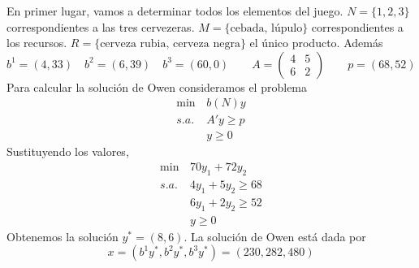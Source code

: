 \documentclass[twoside]{article}
\begin{document}
\begin{solucion}
En primer lugar, vamos a determinar todos los elementos del juego. $N=\{1,2,3\}$ correspondientes a las tres cervezeras. $M=\{\text{cebada, lúpulo}\}$ correspondientes a los recursos. $R=\{\text{cerveza rubia, cerveza negra}\}$ el único producto. Además
$$
b^1 = (4,33) \quad b^2 =(6,39) \quad b^3 = (60,0) \qquad A = \begin{pmatrix}
4 & 5\\
6 & 2
\end{pmatrix} \qquad p = (68,52)
$$
Para calcular la solución de Owen consideramos el problema
\begin{align*}
\min\, & b(N)y\\
s.a.\,&A'y\geq p\\
& y\geq 0
\end{align*}
Sustituyendo los valores,
\begin{align*}
\min\, & 70y_1 + 72y_2\\
s.a.\,&
4y_1 + 5y_2\geq 68\\
&6y_1 + 2y_2 \geq 52\\
& y\geq 0
\end{align*}
Obtenemos la solución $y^* = (8,6)$. La solución de Owen está dada por
$$
x = (b^1y^*,b^2y^*,b^3y^*) = (230,282,480) 
$$
\end{solucion}
\end{document}
